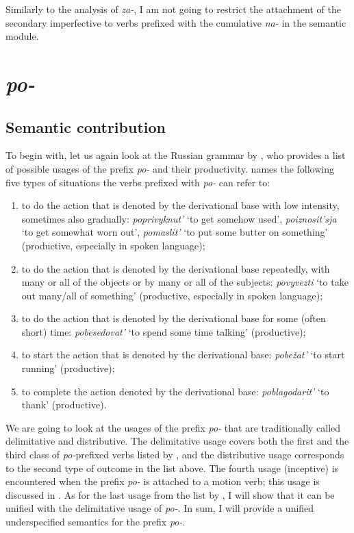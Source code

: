 Similarly to the analysis of \textit{za-}, I am not going to restrict the attachment of the secondary imperfective to verbs prefixed with the cumulative \textit{na-} in the semantic module.

\section{\textit{po-}}\label{subsection:semantics:po}
\subsection{Semantic contribution} To begin with, let us again look at the Russian grammar by \citet{Shvedova:82}, who provides a list of possible usages of the prefix \textit{po-} and their productivity. \citet[364--365]{Shvedova:82} names the following five types of situations the verbs prefixed with \textit{po-} can refer to:
\begin{enumerate}
\item to do the action that is denoted by the derivational base with low intensity, sometimes also gradually: \textit{poprivyknut'} `to get somehow used', \textit{po\-izno\-sit'sja} `to get somewhat worn out', \textit{pomaslit'} `to put some butter on something'  (productive, especially in spoken language);
\item to do the action that is denoted by the derivational base repeatedly, with many or all of the objects or by many or all of the subjects: \textit{povyvezti} `to take out many/all of something' (productive, especially in spoken language);
\item to do the action that is denoted by the derivational base for some (often short) time: \textit{pobesedovat'} `to spend some time talking' (productive);
\item to start the action that is denoted by the derivational base: \textit{pobe\v{z}at'} `to start running' (productive);
\item to complete the action denoted by the derivational base: \textit{poblagodarit'} `to thank' (productive).
\end{enumerate}

We are going to look at the usages of the prefix \textit{po-} that are traditionally called delimitative and distributive. The delimitative usage covers both the first and the third class of \textit{po-}prefixed verbs listed by \citet{Shvedova:82}, and the distributive usage corresponds to the second type of outcome in the list above. The fourth usage (inceptive) is encountered when the prefix \textit{po-} is attached to a motion verb; this usage is discussed in \citealt{ZinovaOsswald:paper}. As for the last usage from the list by \citet{Shvedova:82}, I will show that it can be unified with the delimitative usage of \textit{po-}. In sum, I will provide a unified underspecified semantics for the prefix \textit{po-}.

